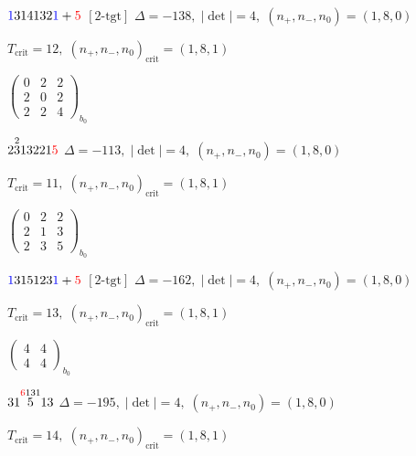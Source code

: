 \documentclass[10pt]{article}
\begin{document}
\smallskip

$\textcolor{blue}{1}314132\textcolor{blue}{1}+\textcolor{red}{5}$ $\scriptstyle [2\text{-tgt}]$ \quad $\Delta=-138,\; |\det|=4,\; (n_+,n_-,n_0)=(1,8,0)$

\hspace{1em}$T_{\text{crit}}=12,\; (n_+,n_-,n_0)_{\text{crit}}=(1,8,1)$

\hspace{2em}$\left(\begin{smallmatrix}0 & 2 & 2 \\ 2 & 0 & 2 \\ 2 & 2 & 4\end{smallmatrix}\right)_{\!b_0}$

\smallskip

$2\overset{2}{3}13221\textcolor{red}{5}$ \quad $\Delta=-113,\; |\det|=4,\; (n_+,n_-,n_0)=(1,8,0)$

\hspace{1em}$T_{\text{crit}}=11,\; (n_+,n_-,n_0)_{\text{crit}}=(1,8,1)$

\hspace{2em}$\left(\begin{smallmatrix}0 & 2 & 2 \\ 2 & 1 & 3 \\ 2 & 3 & 5\end{smallmatrix}\right)_{\!b_0}$

\smallskip

$\textcolor{blue}{1}315123\textcolor{blue}{1}+\textcolor{red}{5}$ $\scriptstyle [2\text{-tgt}]$ \quad $\Delta=-162,\; |\det|=4,\; (n_+,n_-,n_0)=(1,8,0)$

\hspace{1em}$T_{\text{crit}}=13,\; (n_+,n_-,n_0)_{\text{crit}}=(1,8,1)$

\hspace{2em}$\left(\begin{smallmatrix}4 & 4 \\ 4 & 4\end{smallmatrix}\right)_{\!b_0}$

\smallskip

$31\overset{\textcolor{red}{6}131}{5}13$ \quad $\Delta=-195,\; |\det|=4,\; (n_+,n_-,n_0)=(1,8,0)$

\hspace{1em}$T_{\text{crit}}=14,\; (n_+,n_-,n_0)_{\text{crit}}=(1,8,1)$
\end{document}
